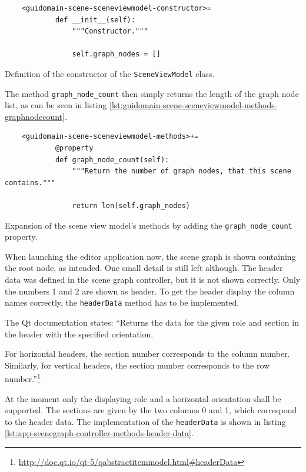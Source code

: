 \documentclass[10pt, openright, notitlepage]{scrreprt}
\begin{document}
\begin{listing}[H]
\begin{verbatim}
    <guidomain-scene-sceneviewmodel-constructor>=
            def __init__(self):
                """Constructor."""
            
                self.graph_nodes = []
\end{verbatim}
\caption{\label{lst:guidomain-scene-scenegraphviewmodel-constructor}
Definition of the constructor of the \texttt{SceneViewModel} class.}
\end{listing}

The method \texttt{graph\_node\_count} then simply returns the length of the
graph node list, as can be seen in listing
\ref{lst:guidomain-scene-sceneviewmodel-methods-graphnodecount}.

\begin{listing}[H]
\begin{verbatim}
    <guidomain-scene-sceneviewmodel-methods>+=
            @property
            def graph_node_count(self):
                """Return the number of graph nodes, that this scene contains."""
            
                return len(self.graph_nodes)
\end{verbatim}
\caption{\label{lst:guidomain-scene-sceneviewmodel-methods-graphnodecount}
Expansion of the scene view model's methods by adding the \texttt{graph\_node\_count} property.}
\end{listing}

When launching the editor application now, the scene graph is shown containing
the root node, as intended. One small detail is still left although. The header
data was defined in the scene graph controller, but it is not shown correctly.
Only the numbers 1 and 2 are shown as header. To get the header display the
column names correctly, the \texttt{headerData} method has to be implemented.

The Qt documentation states: ``Returns the data for the given role and section
in the header with the specified orientation.

For horizontal headers, the section number corresponds to the column number.
Similarly, for vertical headers, the section number corresponds to the row
number.''\footnote{\url{http://doc.qt.io/qt-5/qabstractitemmodel.html\#headerData}}

At the moment only the displaying-role and a horizontal orientation shall be
supported. The sections are given by the two columns 0 and 1, which correspond
to the header data. The implementation of the \texttt{headerData} is shown in
listing \ref{lst:app-scenegraph-controller-methods-header-data}.
\end{document}
